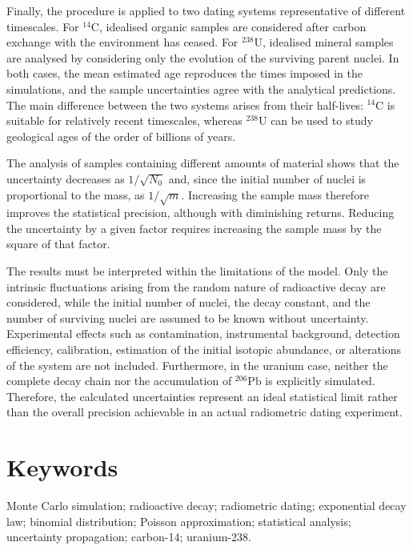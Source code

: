 \documentclass[12pt,a4paper]{article}
\begin{document}
Finally, the procedure is applied to two dating systems representative of different timescales. For $^{14}\text{C}$, idealised organic samples are considered after carbon exchange with the environment has ceased. For $^{238}\text{U}$, idealised mineral samples are analysed by considering only the evolution of the surviving parent nuclei. In both cases, the mean estimated age reproduces the times imposed in the simulations, and the sample uncertainties agree with the analytical predictions. The main difference between the two systems arises from their half-lives: $^{14}\text{C}$ is suitable for relatively recent timescales, whereas $^{238}\text{U}$ can be used to study geological ages of the order of billions of years.

The analysis of samples containing different amounts of material shows that the uncertainty decreases as $1/\sqrt{N_0}$ and, since the initial number of nuclei is proportional to the mass, as $1/\sqrt{m}$. Increasing the sample mass therefore improves the statistical precision, although with diminishing returns. Reducing the uncertainty by a given factor requires increasing the sample mass by the square of that factor.

The results must be interpreted within the limitations of the model. Only the intrinsic fluctuations arising from the random nature of radioactive decay are considered, while the initial number of nuclei, the decay constant, and the number of surviving nuclei are assumed to be known without uncertainty. Experimental effects such as contamination, instrumental background, detection efficiency, calibration, estimation of the initial isotopic abundance, or alterations of the system are not included. Furthermore, in the uranium case, neither the complete decay chain nor the accumulation of $^{206}\text{Pb}$ is explicitly simulated. Therefore, the calculated uncertainties represent an ideal statistical limit rather than the overall precision achievable in an actual radiometric dating experiment.

\section*{Keywords}

Monte Carlo simulation; radioactive decay; radiometric dating; exponential decay law; binomial distribution; Poisson approximation; statistical analysis; uncertainty propagation; carbon-14; uranium-238.



\bigskip
\end{document}
